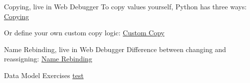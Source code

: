 \documentclass[10pt, colorlinks=true, urlcolor=blue]{beamer}
\begin{document}
\begin{frame}[fragile]{Copying, live in Web Debugger}
  To copy values yourself, Python has three ways:
 \href{https://memory-graph.com/#code=import+copy%0A%0Aa+%3D+%5B+%5B1%2C+2%5D%2C+%5B%27x%27%2C+%27y%27%5D+%5D%0A%0Ac1+%3D+a++++++++++++++++%0Ac2+%3D+copy.copy%28a%29+++++%0Ac3+%3D+copy.deepcopy%28a%29+%0A%0A%23+c1%3A+assignment%2C+++nothing+is+copied%2C+everything+is+shared%0A%23+c2%3A+shallow+copy%2C+first+element+is+copied%2C+underlying+is+shared%0A%23+c3%3A+deep+copy%2C++++everything+is+copied%2C+nothing+is+shared%0A}{Copying} \\
 \vspace{1em}

 Or define your own custom copy logic:
 \href{https://memory-graph.com/#code=import+copy%0A%0Aa+%3D+%5B+%5B1%2C+2%5D%2C+%5B%27x%27%2C+%27y%27%5D+%5D%0A%0Ac1+%3D+a++++++++++++++++%0Ac2+%3D+copy.copy%28a%29+++++%0Ac3+%3D+copy.deepcopy%28a%29+%0A%0A%23+c1%3A+assignment%2C+++nothing+is+copied%2C+everything+is+shared%0A%23+c2%3A+shallow+copy%2C+first+element+is+copied%2C+underlying+is+shared%0A%23+c3%3A+deep+copy%2C++++everything+is+copied%2C+nothing+is+shared%0A%0Adef+custom_copy%28a%29%3A%0A++++c+%3D+a.copy%28%29+%23+shallow+copy%0A++++c%5B1%5D+%3D+a%5B1%5D.copy%28%29%0A++++return+c%0A++++%0Ac4+%3D+custom_copy%28a%29%0A%0A%23+c4%3A+custom+copy%2C+++you+decide+what+is+copied+and+shared%0A&breakpoints=18}{Custom Copy}
\end{frame}


\begin{frame}[fragile]{Name Rebinding, live in Web Debugger}
  Difference between changing and reassigning:
  \href{https://memory-graph.com/#code=%0Aa+%3D+%5B4%2C+3%2C+2%5D%0Ab+%3D+a%0A%0Ab+%2B%3D+%5B1%5D++++++++%23+changing+%27b%27+changes+%27a%27%0Ab+%3D+%5B100%2C+200%5D++%23+but+reassignment+rebinds+%27b%27+to+another+value%2C+%27a%27+is+uneffected%0A}{Name Rebinding}
\end{frame}

\begin{frame}{Data Model Exercises}
  \href{https://memory-graph.com/#codeurl=https://raw.githubusercontent.com/bterwijn/memory_graph_videos/refs/heads/main/exercises/exercise9.py}{test}


\end{frame}
\end{document}
